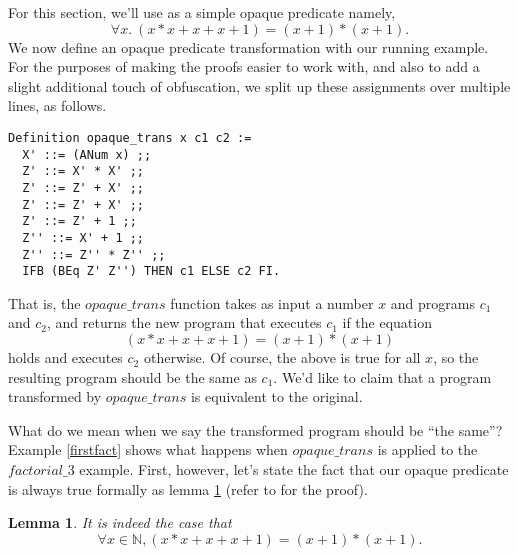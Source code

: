 \documentclass[compsoc,conference,a4paper,10pt,times]{IEEEtran}
\newtheorem{lemma}[theorem]{Lemma}
\begin{document}
%    
    

For this section, we'll use as a simple opaque predicate namely,
    \[
    	\forall x.\ (x * x + x + x + 1) = (x + 1) * (x + 1).
    \]
We now define an opaque predicate transformation with our running example.  
    For the purposes of making the proofs easier to work with, and also to add a slight additional touch of obfuscation, we split up these assignments over multiple lines, as follows.
\begin{verbatim}
Definition opaque_trans x c1 c2 :=
  X' ::= (ANum x) ;;
  Z' ::= X' * X' ;;
  Z' ::= Z' + X' ;;
  Z' ::= Z' + X' ;;
  Z' ::= Z' + 1 ;;
  Z'' ::= X' + 1 ;;
  Z'' ::= Z'' * Z'' ;;
  IFB (BEq Z' Z'') THEN c1 ELSE c2 FI.
\end{verbatim}
That is, the $opaque\_trans$ function takes as input a number $x$ and programs $c_1$ and $c_2$, and returns the new program that executes $c_1$ if the equation
\[
	(x * x + x + x + 1) = (x + 1) * (x + 1)
\]
holds and executes $c_2$ otherwise.  Of course, the above is true for all $x$, so the resulting program should be the same as $c_1$.  We'd like to claim that a program transformed by $opaque\_trans$ is equivalent to the original.

\par What do we mean when we say the transformed program should be ``the same''?  Example \ref{firstfact} shows what happens when $opaque\_trans$ is applied to the $factorial\_3$ example.  First, however, let's state the fact that our opaque predicate is always true formally as lemma \ref{opaqueness} (refer to \cite{Weyun} for the proof).


\begin{lemma}\label{opaqueness}
    It is indeed the case that 
    \[ \forall x \in \mathbb{N}, 
	(x * x + x + x + 1) = (x + 1) * (x + 1).  \] 
\end{lemma}
\end{document}
